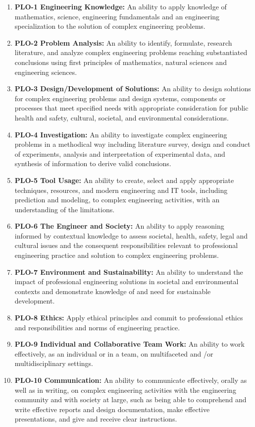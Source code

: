 \begin{enumerate}
\item \textbf{PLO-1 Engineering Knowledge:} An ability to apply knowledge of mathematics, science, engineering fundamentals and an engineering specialization to the solution of complex engineering problems.
\item \textbf{PLO-2 Problem Analysis:} An ability to identify, formulate, research literature, and analyze complex engineering problems reaching substantiated conclusions using first principles of mathematics, natural sciences and engineering sciences.
\item \textbf{PLO-3 Design/Development of Solutions:} An ability to design solutions for complex engineering problems and design systems, components or processes that meet specified needs with appropriate consideration for public health and safety, cultural, societal, and environmental considerations.
\item \textbf{PLO-4 Investigation:} An ability to investigate complex engineering problems in a methodical way including literature survey, design and conduct of experiments, analysis and interpretation of experimental data, and synthesis of information to derive valid conclusions.
\item \textbf{PLO-5 Tool Usage:} An ability to create, select and apply appropriate techniques, resources, and modern engineering and IT tools, including prediction and modeling, to complex engineering activities, with an understanding of the limitations.
\item \textbf{PLO-6 The Engineer and Society:} An ability to apply reasoning informed by contextual knowledge to assess societal, health, safety, legal and cultural issues and the consequent responsibilities relevant to professional engineering practice and solution to complex engineering problems.
\item \textbf{PLO-7 Environment and Sustainability:} An ability to understand the impact of professional engineering solutions in societal and environmental contexts and demonstrate knowledge of and need for sustainable development.
\item \textbf{PLO-8 Ethics:} Apply ethical principles and commit to professional ethics and responsibilities and norms of engineering practice.
\item \textbf{PLO-9 Individual and Collaborative Team Work:} An ability to work effectively, as an individual or in a team, on multifaceted and /or multidisciplinary settings.
\item \textbf{PLO-10 Communication:} An ability to communicate effectively, orally as well as in writing, on complex engineering activities with the engineering community and with society at large, such as being able to comprehend and write effective reports and design documentation, make effective presentations, and give and receive clear instructions.

\end{enumerate}
